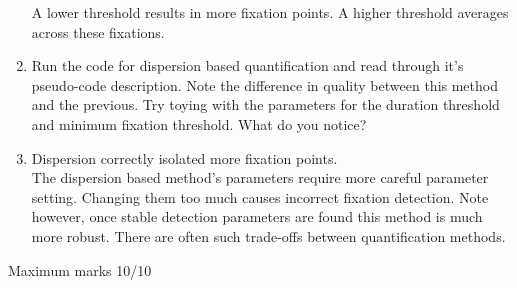 \documentclass[12pt,english]{scrartcl}
\begin{document}
\begin{enumerate}
 \color{blue}
 A lower threshold results in more fixation points. A higher threshold averages across these fixations. \\
 
 \color{black}
 \item Run the code for dispersion based quantification and read through it's pseudo-code description. Note the difference in quality between this method and the previous. Try toying with the parameters for the duration threshold and minimum fixation threshold. What do you notice? \\
 \item[]
 \color{blue}
 Dispersion correctly isolated more fixation points. \\
 
 The dispersion based method's parameters require more careful parameter setting. Changing them too much causes incorrect fixation detection. Note however, once stable detection parameters are found this method is much more robust. There are often such trade-offs between quantification methods.
  

 \end{enumerate}
 \color{black}
 Maximum marks 10/10 \\
\end{document}
